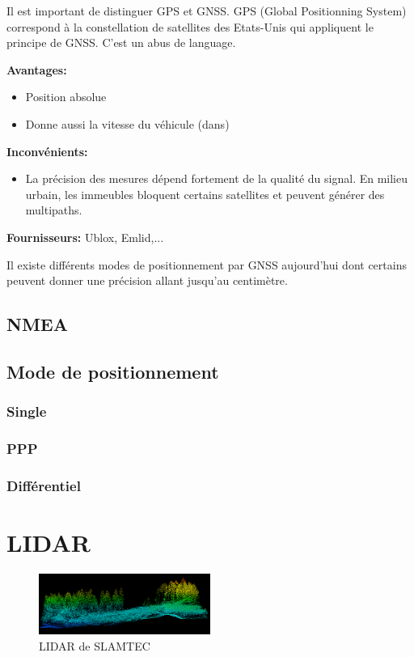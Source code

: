 \documentclass[a4paper, 11pt]{report}
\begin{document}
Il est important de distinguer GPS et GNSS. GPS (Global Positionning System) correspond à la constellation de satellites des Etats-Unis qui appliquent le principe de GNSS. C'est un abus de language.

\textbf{Avantages:}
\begin{itemize}
\item Position absolue
\item Donne aussi la vitesse du véhicule (dans)
\end{itemize}

\textbf{Inconvénients:}
\begin{itemize}
\item La précision des mesures dépend fortement de la qualité du signal. En milieu urbain, les immeubles bloquent certains satellites et peuvent générer des multipaths.
\end{itemize}

\textbf{Fournisseurs:} Ublox, Emlid,...

Il existe différents modes de positionnement par GNSS aujourd'hui dont certains peuvent donner une  précision allant jusqu'au centimètre.

\subsection{NMEA}

\subsection{Mode de positionnement}

\subsubsection{Single}

\subsubsection{PPP}

\subsubsection{Différentiel}


\section{LIDAR}

\begin{figure}[h!]
\begin{centering}
\includegraphics[width=0.5\textwidth]{images/NuageDePoints.png}
\caption{LIDAR de SLAMTEC}
\par\end{centering}
\end{figure}
\end{document}
